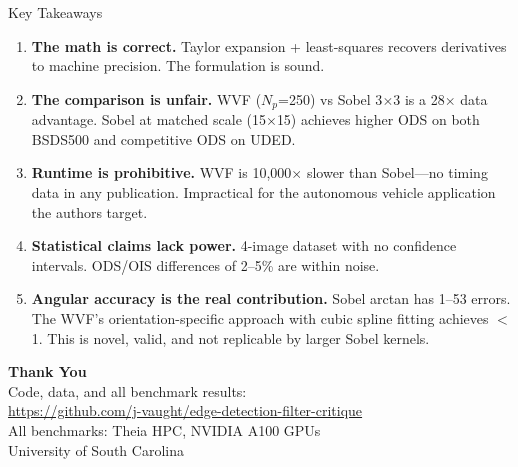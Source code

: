 \documentclass[10pt, aspectratio=169]{beamer}
\begin{document}
\begin{frame}{Key Takeaways}
  \begin{enumerate}
    \item \textbf{The math is correct.} Taylor expansion + least-squares recovers derivatives to machine precision. The formulation is sound.
    \vspace{0.4em}
    \item \textbf{The comparison is unfair.} WVF ($N_p$=250) vs Sobel 3$\times$3 is a 28$\times$ data advantage. Sobel at matched scale (15$\times$15) achieves higher ODS on both BSDS500 and competitive ODS on UDED.
    \vspace{0.4em}
    \item \textbf{Runtime is prohibitive.} WVF is 10,000$\times$ slower than Sobel---no timing data in any publication. Impractical for the autonomous vehicle application the authors target.
    \vspace{0.4em}
    \item \textbf{Statistical claims lack power.} 4-image dataset with no confidence intervals. ODS/OIS differences of 2--5\% are within noise.
    \vspace{0.4em}
    \item \textbf{Angular accuracy is the real contribution.} Sobel arctan has 1--53\textdegree{} errors. The WVF's orientation-specific approach with cubic spline fitting achieves $<$1\textdegree{}. This is novel, valid, and not replicable by larger Sobel kernels.
  \end{enumerate}
\end{frame}

\begin{frame}{}
  \begin{center}
    \vspace{1.5em}
    {\Large\bfseries Thank You}\\[1.5em]
    {\normalsize Code, data, and all benchmark results:}\\[0.5em]
    \url{https://github.com/j-vaught/edge-detection-filter-critique}\\[1.5em]
    {\small All benchmarks: Theia HPC, NVIDIA A100 GPUs\\
    University of South Carolina}
  \end{center}
\end{frame}
\end{document}
